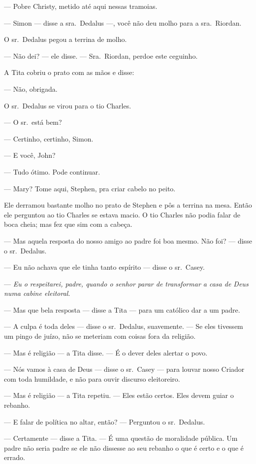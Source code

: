  --- Pobre Christy, metido até aqui nessas tramoias.

 --- Simon --- disse a sra.~Dedalus ---, você não deu molho para a sra.~Riordan.

O sr.~Dedalus pegou a terrina de molho.

 --- Não dei? --- ele disse. --- Sra.~Riordan, perdoe este ceguinho.

A Tita cobriu o prato com as mãos e disse:

 --- Não, obrigada.

O sr.~Dedalus se virou para o tio Charles.

 --- O sr.~está bem?

 --- Certinho, certinho, Simon.

 --- E você, John?

 --- Tudo ótimo. Pode continuar.

 --- Mary? Tome aqui, Stephen, pra criar cabelo no peito.

Ele derramou bastante molho no prato de Stephen e pôs a terrina na mesa.
Então ele perguntou ao tio Charles se estava macio. O tio Charles não
podia falar de boca cheia; mas fez que sim com a cabeça.

 --- Mas aquela resposta do nosso amigo ao padre foi boa mesmo. Não foi? --- disse o sr.~Dedalus.

 --- Eu não achava que ele tinha tanto espírito --- disse o sr.~Casey.

 --- \textit{Eu o respeitarei, padre, quando o senhor parar de transformar a casa de Deus numa cabine eleitoral}.

 --- Mas que bela resposta --- disse a Tita --- para um católico dar a um padre.

 --- A culpa é toda deles --- disse o sr.~Dedalus, suavemente. --- Se eles
tivessem um pingo de juízo, não se meteriam com coisas fora da
religião.

 --- Mas é religião --- a Tita disse. --- É o dever deles alertar o povo.

 --- Nós vamos à casa de Deus --- disse o sr.~Casey --- para louvar nosso Criador com toda humildade, e não para ouvir discurso eleitoreiro.

 --- Mas é religião --- a Tita repetiu. --- Eles estão certos. Eles devem guiar o rebanho.

 --- E falar de política no altar, então? --- Perguntou o sr.~Dedalus.

 --- Certamente --- disse a Tita. --- É uma questão de moralidade pública. Um padre não seria padre se ele não dissesse ao seu rebanho o que é certo
e o que é errado.

